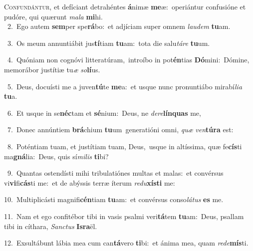 \lettrine{\initial\textcolor{\initialcolor}{C}}{onfundántur,} et defíciant detrahéntes \textbf{á}\-nimæ \textbf{me}\-æ:~\star operiántur confusióne et pudóre, qui quærunt \textit{ma}\-\textit{la} \textbf{mi}\-hi.\\
{\numbfont\textcolor{\numbcolor}{~2.}}~Ego autem \textbf{sem}\-per spe\-\textbf{rá}\-bo:~\star et adjíciam super omnem \textit{lau}\-\textit{dem} \textbf{tu}\-am.\par
{\numbfont\textcolor{\numbcolor}{~3.}}~Os meum annuntiábit jus\-\textbf{tí}\-tiam \textbf{tu}\-am:~\star tota die salu\-\textit{tá}\-\textit{re} \textbf{tu}\-um.\par
{\numbfont\textcolor{\numbcolor}{~4.}}~Quóniam non cognóvi litteratúram,~\dagger introíbo in pot\-\textbf{én}\-tias \textbf{Dó}\-mini:~\star Dómine, memorábor justítiæ tu\textit{æ} \textit{so}\-\textbf{lí}us.\par
{\numbfont\textcolor{\numbcolor}{~5.}}~Deus, docuísti me a juven\-\textbf{tú}\-te \textbf{me}\-a:~\star et usque nunc pronuntiábo mirabí\-\textit{li}\-\textit{a} \textbf{tu}\-a.\par
{\numbfont\textcolor{\numbcolor}{~6.}}~Et usque in se\-\textbf{néc}\-tam et \textbf{sé}\-nium:~\star Deus, ne \textit{de}\-\textit{re}\textbf{lín}\textbf{quas} me,\par
{\numbfont\textcolor{\numbcolor}{~7.}}~Donec annúntiem \textbf{brá}\-chium \textbf{tu}\-um~\star generatióni omni, \textit{quæ} \textit{ven}\-\textbf{tú}\textbf{ra} est:\par
{\numbfont\textcolor{\numbcolor}{~8.}}~Poténtiam tuam, et justítiam tuam, Deus,~\dagger usque in altíssima, quæ fe\-\textbf{cís}\-ti ma\-\textbf{gná}\-lia:~\star Deus, quis sí\-\textit{mi}\-\textit{lis} \textbf{ti}\-bi?\par
{\numbfont\textcolor{\numbcolor}{~9.}}~Quantas ostendísti mihi tribulatiónes multas et malas:~\dagger et convérsus vi\-\textbf{vi}\-fi\-\textbf{cás}\-ti me:~\star et de abýssis terræ íterum \textit{re}\-\textit{du}\textbf{xís}\textbf{ti} me:\par
{\numbfont\textcolor{\numbcolor}{10.}}~Multiplicásti magnifi\-\textbf{cén}\-tiam \textbf{tu}\-am:~\star et convérsus conso\-\textit{lá}\-\textit{tus} \textbf{es} me.\par
{\numbfont\textcolor{\numbcolor}{11.}}~Nam et ego confitébor tibi in vasis psalmi veri\-\textbf{tá}\-tem \textbf{tu}\-am:~\star Deus, psallam tibi in cíthara, \textit{Sanc}\-\textit{tus} \textbf{Is}\-\textbf{ra}ël.\par
{\numbfont\textcolor{\numbcolor}{12.}}~Exsultábunt lábia mea cum can\-\textbf{tá}\-vero \textbf{ti}\-bi:~\star et ánima mea, quam \textit{red}\-\textit{e}\textbf{mís}ti.\par
